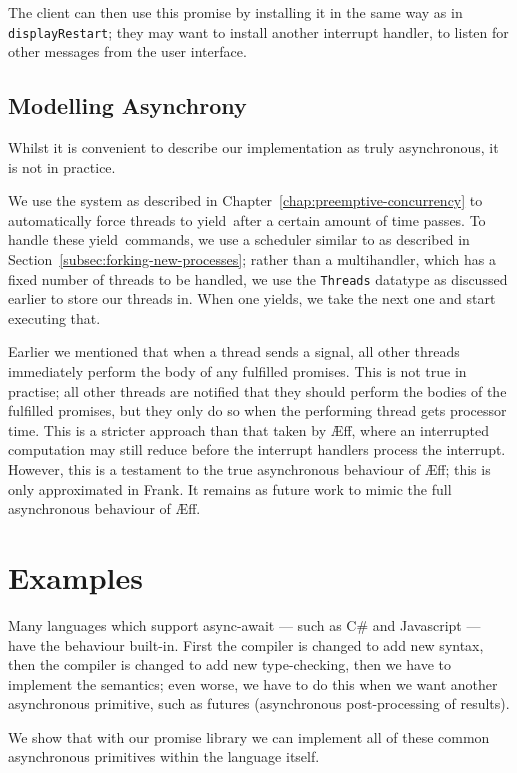 \documentclass[msc,deptreport,cs]{infthesis} %
\newcommand{\code}[1]{\lstinline{#1}}
\newcommand\aeff{{\AE}ff\xspace}
\newcommand\yield{\textsf{yield}\xspace}
\begin{document}
The client can then use this promise by installing it in the same way as in
\code{displayRestart}; they may want to install another interrupt handler, to
listen for other messages from the user interface.

\section{Modelling Asynchrony}

Whilst it is convenient to describe our implementation as truly asynchronous, it
is not in practice.

We use the system as described in Chapter~\ref{chap:preemptive-concurrency} to
automatically force threads to \yield~after a certain amount of time passes. To
handle these \yield~commands, we use a scheduler similar to as described in
Section~\ref{subsec:forking-new-processes}; rather than a multihandler, which
has a fixed number of threads to be handled, we use the \code{Threads} datatype
as discussed earlier to store our threads in. When one yields, we take the next
one and start executing that.

Earlier we mentioned that when a thread sends a signal, all other threads
immediately perform the body of any fulfilled promises. This is not true in
practise; all other threads are notified that they should perform the bodies of
the fulfilled promises, but they only do so when the performing thread gets
processor time.
%
This is a stricter approach than that taken by \aeff, where an interrupted
computation may still reduce before the interrupt handlers process the
interrupt. However, this is a testament to the true asynchronous behaviour of
\aeff; this is only approximated in Frank. It remains as future work to mimic
the full asynchronous behaviour of \aeff.


\chapter{Examples}
\label{chap:examples}

Many languages which support async-await --- such as C# and Javascript --- have
the behaviour built-in. First the compiler is changed to add new syntax, then
the compiler is changed to add new type-checking, then we have to implement the
semantics; even worse, we have to do this when we want another asynchronous
primitive, such as futures (asynchronous post-processing of results).

We show that with our promise library we can implement all of these common
asynchronous primitives within the language itself.
\end{document}
